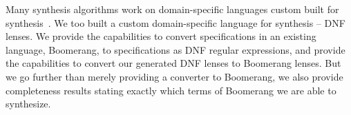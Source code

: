 \documentclass[acmsmall,screen]{acmart}
\begin{document}
Many synthesis algorithms work on domain-specific
languages custom built for
synthesis~\cite{flashfill,le-pldi-2014,solar-lezama-thesis-2008,yag+:pldi16}.  We
too built a custom domain-specific 
language for synthesis -- DNF lenses.  We provide the capabilities to
convert specifications in an existing language, Boomerang, to specifications as
DNF regular expressions, and provide the 
capabilities to convert our generated DNF lenses to Boomerang lenses.
But we go further than merely providing a converter to Boomerang, we also
provide completeness results stating exactly which terms of Boomerang we are
able to synthesize. 


\end{document}
